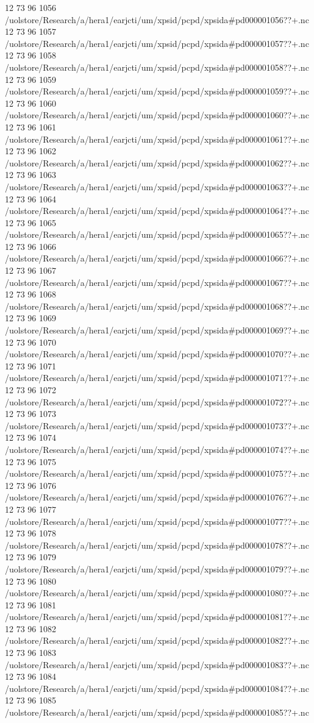 12 73 96
1056
/uolstore/Research/a/hera1/earjcti/um/xpsid/pcpd/xpsida#pd000001056??+.nc
12 73 96
1057
/uolstore/Research/a/hera1/earjcti/um/xpsid/pcpd/xpsida#pd000001057??+.nc
12 73 96
1058
/uolstore/Research/a/hera1/earjcti/um/xpsid/pcpd/xpsida#pd000001058??+.nc
12 73 96
1059
/uolstore/Research/a/hera1/earjcti/um/xpsid/pcpd/xpsida#pd000001059??+.nc
12 73 96
1060
/uolstore/Research/a/hera1/earjcti/um/xpsid/pcpd/xpsida#pd000001060??+.nc
12 73 96
1061
/uolstore/Research/a/hera1/earjcti/um/xpsid/pcpd/xpsida#pd000001061??+.nc
12 73 96
1062
/uolstore/Research/a/hera1/earjcti/um/xpsid/pcpd/xpsida#pd000001062??+.nc
12 73 96
1063
/uolstore/Research/a/hera1/earjcti/um/xpsid/pcpd/xpsida#pd000001063??+.nc
12 73 96
1064
/uolstore/Research/a/hera1/earjcti/um/xpsid/pcpd/xpsida#pd000001064??+.nc
12 73 96
1065
/uolstore/Research/a/hera1/earjcti/um/xpsid/pcpd/xpsida#pd000001065??+.nc
12 73 96
1066
/uolstore/Research/a/hera1/earjcti/um/xpsid/pcpd/xpsida#pd000001066??+.nc
12 73 96
1067
/uolstore/Research/a/hera1/earjcti/um/xpsid/pcpd/xpsida#pd000001067??+.nc
12 73 96
1068
/uolstore/Research/a/hera1/earjcti/um/xpsid/pcpd/xpsida#pd000001068??+.nc
12 73 96
1069
/uolstore/Research/a/hera1/earjcti/um/xpsid/pcpd/xpsida#pd000001069??+.nc
12 73 96
1070
/uolstore/Research/a/hera1/earjcti/um/xpsid/pcpd/xpsida#pd000001070??+.nc
12 73 96
1071
/uolstore/Research/a/hera1/earjcti/um/xpsid/pcpd/xpsida#pd000001071??+.nc
12 73 96
1072
/uolstore/Research/a/hera1/earjcti/um/xpsid/pcpd/xpsida#pd000001072??+.nc
12 73 96
1073
/uolstore/Research/a/hera1/earjcti/um/xpsid/pcpd/xpsida#pd000001073??+.nc
12 73 96
1074
/uolstore/Research/a/hera1/earjcti/um/xpsid/pcpd/xpsida#pd000001074??+.nc
12 73 96
1075
/uolstore/Research/a/hera1/earjcti/um/xpsid/pcpd/xpsida#pd000001075??+.nc
12 73 96
1076
/uolstore/Research/a/hera1/earjcti/um/xpsid/pcpd/xpsida#pd000001076??+.nc
12 73 96
1077
/uolstore/Research/a/hera1/earjcti/um/xpsid/pcpd/xpsida#pd000001077??+.nc
12 73 96
1078
/uolstore/Research/a/hera1/earjcti/um/xpsid/pcpd/xpsida#pd000001078??+.nc
12 73 96
1079
/uolstore/Research/a/hera1/earjcti/um/xpsid/pcpd/xpsida#pd000001079??+.nc
12 73 96
1080
/uolstore/Research/a/hera1/earjcti/um/xpsid/pcpd/xpsida#pd000001080??+.nc
12 73 96
1081
/uolstore/Research/a/hera1/earjcti/um/xpsid/pcpd/xpsida#pd000001081??+.nc
12 73 96
1082
/uolstore/Research/a/hera1/earjcti/um/xpsid/pcpd/xpsida#pd000001082??+.nc
12 73 96
1083
/uolstore/Research/a/hera1/earjcti/um/xpsid/pcpd/xpsida#pd000001083??+.nc
12 73 96
1084
/uolstore/Research/a/hera1/earjcti/um/xpsid/pcpd/xpsida#pd000001084??+.nc
12 73 96
1085
/uolstore/Research/a/hera1/earjcti/um/xpsid/pcpd/xpsida#pd000001085??+.nc
